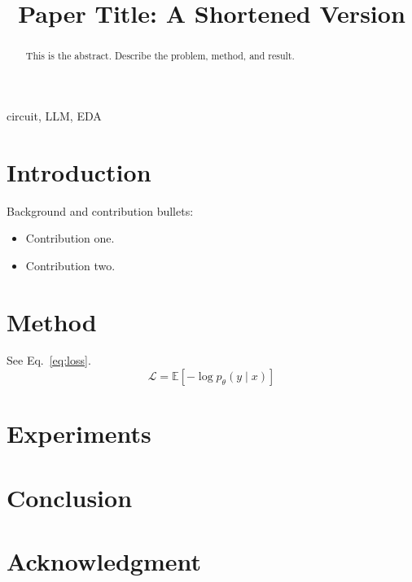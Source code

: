 \documentclass[conference]{IEEEtran}
\begin{document}
\title{Paper Title: A Shortened Version}

\author{
\and
{}
}

\maketitle

\begin{abstract}
This is the abstract. Describe the problem, method, and result.
\end{abstract}

\begin{IEEEkeywords}
circuit, LLM, EDA
\end{IEEEkeywords}

\section{Introduction}
Background \cite{dac2026} and contribution bullets:
\begin{itemize}
\item Contribution one.
\item Contribution two.
\end{itemize}

\section{Method}
See Eq.~\eqref{eq:loss}.
\begin{equation}
\label{eq:loss}
  \mathcal{L} = \mathbb{E}[-\log p_\theta(y \mid x)]
\end{equation}

\section{Experiments}

\section{Conclusion}

\section*{Acknowledgment}



\end{document}
